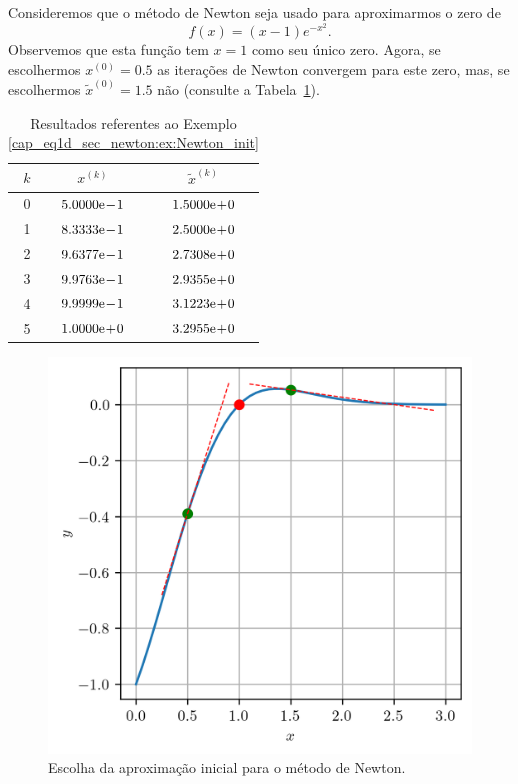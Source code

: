 \begin{ex}\label{cap_eq1d_sec_newton:ex:Newton_init}
  Consideremos que o método de Newton seja usado para aproximarmos o zero de
  \begin{equation}
    f(x) = (x-1)e^{-x^2}.
  \end{equation}
Observemos que esta função tem $x=1$ como seu único zero. Agora, se escolhermos $x^{(0)} = 0.5$ as iterações de Newton convergem para este zero, mas, se escolhermos $\tilde{x}^{(0)}=1.5$ não (consulte a Tabela~\ref{cap_eq1d_sec_newton:tab:ex_Newton_init}).

\begin{table}[H]
  \centering
  \caption{Resultados referentes ao Exemplo \ref{cap_eq1d_sec_newton:ex:Newton_init}}
  \label{cap_eq1d_sec_newton:tab:ex_Newton_init}
  \begin{tabular}{r|cc}
    $k$ & $x^{(k)}$   & $\tilde{x}^{(k)}$ \\\hline
    0 & $5.0000\mathrm{e}\!-\!1$ & $1.5000\mathrm{e}\!+\!0$ \\
    1 & $8.3333\mathrm{e}\!-\!1$ & $2.5000\mathrm{e}\!+\!0$ \\
    2 & $9.6377\mathrm{e}\!-\!1$ & $2.7308\mathrm{e}\!+\!0$ \\
    3 & $9.9763\mathrm{e}\!-\!1$ & $2.9355\mathrm{e}\!+\!0$ \\
    4 & $9.9999\mathrm{e}\!-\!1$ & $3.1223\mathrm{e}\!+\!0$ \\
    5 & $1.0000\mathrm{e}\!+\!0$ & $3.2955\mathrm{e}\!+\!0$ \\
  \end{tabular}
\end{table}

\begin{figure}[H]
  \centering
  \includegraphics[width=\textwidth]{./cap_eq1d/dados/fig_newton_ex_init/fig}
  \caption{Escolha da aproximação inicial para o método de Newton.}
  \label{cap_eq1d_sec_newton:fig:ex_Newton_init}
\end{figure}


\end{ex}
